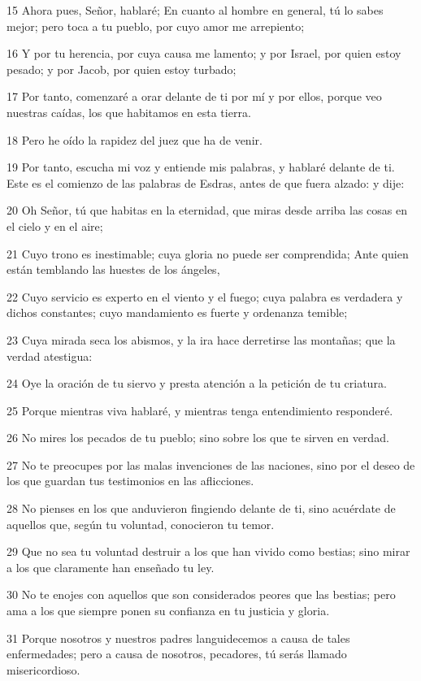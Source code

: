 \par 15 Ahora pues, Señor, hablaré; En cuanto al hombre en general, tú lo sabes mejor; pero toca a tu pueblo, por cuyo amor me arrepiento;
\par 16 Y por tu herencia, por cuya causa me lamento; y por Israel, por quien estoy pesado; y por Jacob, por quien estoy turbado;
\par 17 Por tanto, comenzaré a orar delante de ti por mí y por ellos, porque veo nuestras caídas, los que habitamos en esta tierra.
\par 18 Pero he oído la rapidez del juez que ha de venir.
\par 19 Por tanto, escucha mi voz y entiende mis palabras, y hablaré delante de ti. Este es el comienzo de las palabras de Esdras, antes de que fuera alzado: y dije:
\par 20 Oh Señor, tú que habitas en la eternidad, que miras desde arriba las cosas en el cielo y en el aire;
\par 21 Cuyo trono es inestimable; cuya gloria no puede ser comprendida; Ante quien están temblando las huestes de los ángeles,
\par 22 Cuyo servicio es experto en el viento y el fuego; cuya palabra es verdadera y dichos constantes; cuyo mandamiento es fuerte y ordenanza temible;
\par 23 Cuya mirada seca los abismos, y la ira hace derretirse las montañas; que la verdad atestigua:
\par 24 Oye la oración de tu siervo y presta atención a la petición de tu criatura.
\par 25 Porque mientras viva hablaré, y mientras tenga entendimiento responderé.
\par 26 No mires los pecados de tu pueblo; sino sobre los que te sirven en verdad.
\par 27 No te preocupes por las malas invenciones de las naciones, sino por el deseo de los que guardan tus testimonios en las aflicciones.
\par 28 No pienses en los que anduvieron fingiendo delante de ti, sino acuérdate de aquellos que, según tu voluntad, conocieron tu temor.
\par 29 Que no sea tu voluntad destruir a los que han vivido como bestias; sino mirar a los que claramente han enseñado tu ley.
\par 30 No te enojes con aquellos que son considerados peores que las bestias; pero ama a los que siempre ponen su confianza en tu justicia y gloria.
\par 31 Porque nosotros y nuestros padres languidecemos a causa de tales enfermedades; pero a causa de nosotros, pecadores, tú serás llamado misericordioso.
